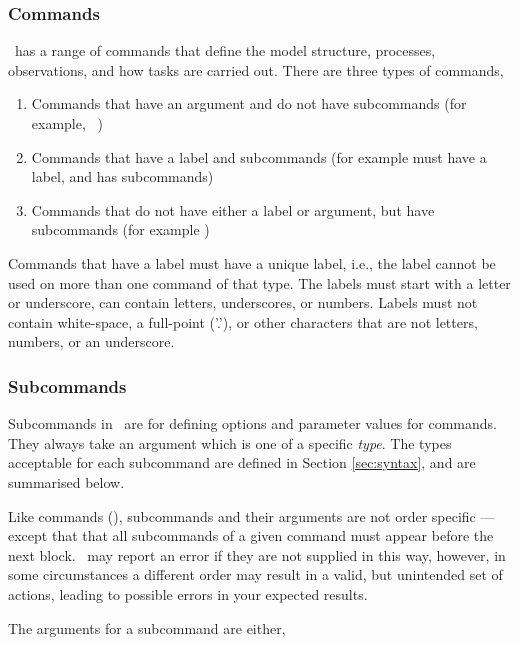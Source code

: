 \subsubsection{Commands}

\SPM\ has a range of commands that define the model structure, processes, observations, and how tasks are carried out. There are three types of commands, 

\begin{enumerate}
\item Commands that have an argument and do not have subcommands (for example, \ )
\item Commands that have a label and subcommands (for example  must have a label, and has subcommands)
\item Commands that do not have either a label or argument, but have subcommands (for example )
\end{enumerate}

Commands that have a label must have a unique label, i.e., the label cannot be used on more than one command of that type. The labels must start with a letter or underscore, can contain letters, underscores, or numbers. Labels must not contain white-space, a full-point ('.'), or other characters that are not letters, numbers, or an underscore.

\subsubsection{Subcommands}

Subcommands in \SPM\ are for defining options and parameter values for commands. They always take an argument which is one of a specific \emph{type}. The types acceptable for each subcommand are defined in Section \ref{sec:syntax}, and are summarised below. 

Like commands (), subcommands and their arguments are not order specific --- except that that all subcommands of a given command must appear before the next  block. \SPM\ may report an error if they are not supplied in this way, however, in some circumstances a different order may result in a valid, but unintended set of actions, leading to possible errors in your expected results.  

The arguments for a subcommand are either,

